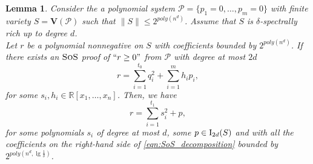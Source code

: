 \documentclass[11pt]{article}
\newcommand{\sos}{\text{\sc{SoS}}}
\newcommand{\Variety}[1]{{\textbf{V}}\left( #1 \right)}
\newcommand{\I}{\emph{$\rm{I}$}}
\newcommand{\1}{\textbf{1}}
\newtheorem{lemma}[theorem]{Lemma}
\begin{document}
\begin{lemma}\label{th:SOS_decomposition}
    Consider the a polynomial system $\mathcal{P} = \{p_1 = 0, \ldots, p_m = 0\}$ with finite variety $S = \Variety{\mathcal{P}}$ such that $\| S \| \leq 2^{poly(n^d)}$. Assume that $S$ is $\delta$-spectrally rich up to degree $d$. \\
    Let $r$ be a polynomial nonnegative on $S$ with coefficients bounded by $2^{poly(n^d)}$. If there exists an $\sos$ proof of $``r \geq 0"$ from $\mathcal{P}$ with degree at most $2d$
    \begin{equation}\label{original-SOS}
        r = \sum_{i=1}^{t_0} q_i^2 + \sum_{i=1}^m h_i p_i,
    \end{equation}
    for some $s_i, h_i \in \mathbb{R}[x_1, \ldots, x_n]$. Then, we have
    \begin{equation}\label{eqn:SoS_decomposition}
        r = \sum_{i=1}^{t_1} s_i^2 + p,
    \end{equation}
    for some polynomials $s_i$ of degree at most $d$, some $p\in \I_{2d}(S)$ and with all the coefficients on the right-hand side of \eqref{eqn:SoS_decomposition} bounded by $2^{poly(n^d, \lg \frac{1}{\delta})}$.
\end{lemma}
\end{document}
